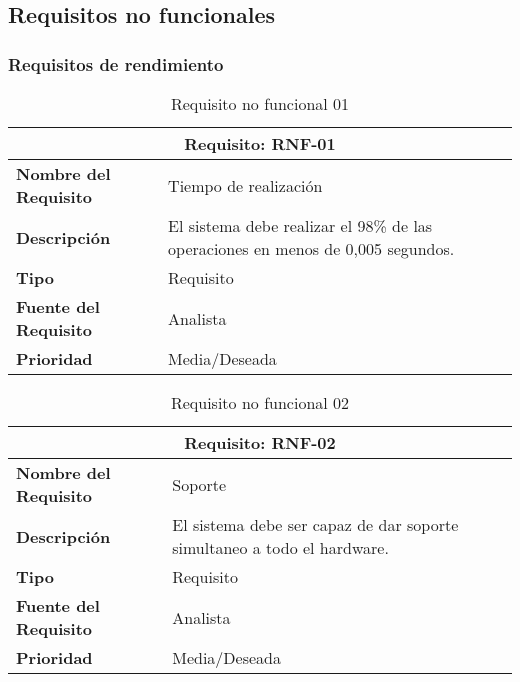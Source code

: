 \subsection{Requisitos no funcionales}

\subsubsection{Requisitos de rendimiento}

\begin{table}[H]
\begin{center}
\begin{tabular}{p{} p{7cm}}
\multicolumn{2}{c}{\textbf{Requisito: RNF-01} } \\
\hline \hline
\textbf{Nombre del Requisito} & Tiempo de realización\\
\hline
\textbf{Descripción} &  El sistema debe realizar el 98\% de las operaciones en menos de 0,005 segundos.\\
\hline
\textbf{Tipo} & Requisito  \\
\hline
\textbf{Fuente del Requisito} & Analista  \\
\hline
\textbf{Prioridad} & Media/Deseada \\ \hline
\end{tabular}
\caption{Requisito no funcional 01}
\label{tab:RNF-01}
\end{center}
\end{table}

\begin{table}[H]
\begin{center}
\begin{tabular}{p{} p{7cm}}
\multicolumn{2}{c}{\textbf{Requisito: RNF-02} } \\
\hline \hline
\textbf{Nombre del Requisito} & Soporte\\
\hline
\textbf{Descripción} & El sistema debe ser capaz de dar soporte simultaneo a todo el hardware.\\
\hline
\textbf{Tipo} & Requisito  \\
\hline
\textbf{Fuente del Requisito} & Analista  \\
\hline
\textbf{Prioridad} & Media/Deseada \\ \hline
\end{tabular}
\caption{Requisito no funcional 02}
\label{tab:RNF-02}
\end{center}
\end{table}

